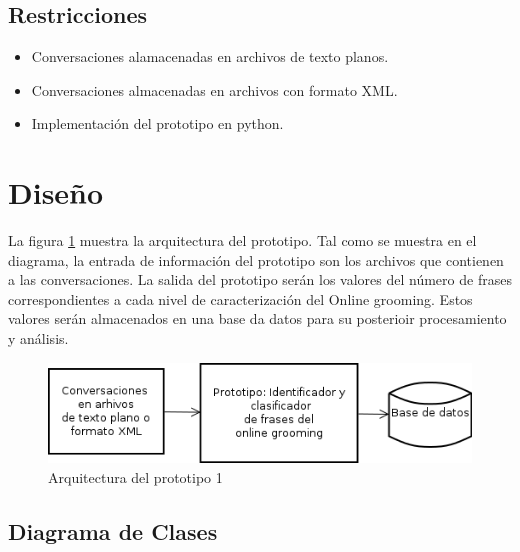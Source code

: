 \subsection{Restricciones}
\begin{itemize}
\item Conversaciones alamacenadas en archivos de texto planos.
\item Conversaciones almacenadas en archivos con formato XML.
\item Implementaci\'on del prototipo en python.

\end{itemize}

\section{Dise\~no}

La figura \ref{fig:arquitectura_prototipo1} muestra la arquitectura del prototipo. Tal como se muestra en el diagrama, la entrada de informaci\'on del prototipo son los archivos que contienen a las conversaciones. La salida del prototipo ser\'an los valores del n\'umero de frases correspondientes a cada nivel de caracterizaci\'on del Online grooming. Estos valores ser\'an almacenados en una base da datos para su posterioir procesamiento y análisis.



	\begin{figure}[!h]
	\begin{center}
	\includegraphics[scale=.5]{images/arquitectura_prototipo1}
	\caption{Arquitectura del prototipo 1}
	\label{fig:arquitectura_prototipo1}
	\end{center}
	\end{figure}


\subsection{Diagrama de Clases}


